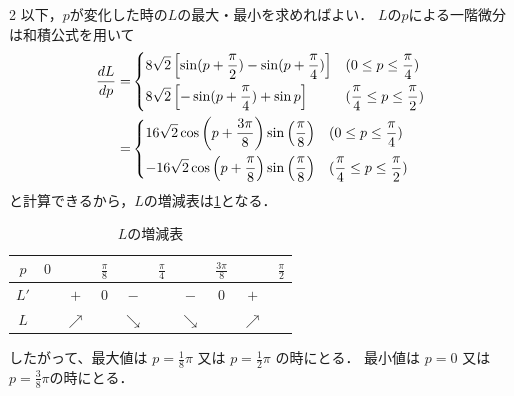 \documentclass[../../../../main.tex]{subfiles}
\begin{document}
\begin{multicols}{2}
  以下，$p$が変化した時の$L$の最大・最小を求めればよい．
  $L$の$p$による一階微分は和積公式を用いて
  \begin{align*}
    \frac{dL}{dp}=
      & \begin{dcases}
          8\sqrt{2}\left[\sin(p+\frac{\pi}{2}) -\sin(p+\frac{\pi}{4})\right] & (0 \le p \le \frac{\pi}{4})             \\
          8\sqrt{2}\left[-\sin(p+\frac{\pi}{4}) + \sin p\right]              & (\frac{\pi}{4} \le p \le \frac{\pi}{2})
        \end{dcases}      \\
    = & \begin{dcases}
          16\sqrt{2}\cos\left(p + \frac{3\pi}{8}\right)\sin\left(\frac{\pi}{8}\right) & (0 \le p \le \frac{\pi}{4})             \\
          -16\sqrt{2}\cos\left(p + \frac{\pi}{8}\right)\sin\left(\frac{\pi}{8}\right) & (\frac{\pi}{4} \le p \le \frac{\pi}{2})
        \end{dcases} \\
  \end{align*}
  と計算できるから，$L$の増減表は\cref{1994-2:table:1}となる．
  \begin{table}[H]
    \centering
    \caption{$L$の増減表}
    \label{1994-2:table:1}
    \begin{tabular}{c||c|c|c|c|c|c|c|c|c|}
      $p$  & $0$ &            & $\frac{\pi}{8}$ &            & $\frac{\pi}{4}$ &            & $\frac{3\pi}{8}$ &            & $\frac{\pi}{2}$ \\
      \hline
      $L'$ &     & $+$        & $0$             & $-$        &                 & $-$        & $0$              & $+$        &                 \\
      \hline
      $L$  &     & $\nearrow$ &                 & $\searrow$ &                 & $\searrow$ &                  & $\nearrow$ &
    \end{tabular}
  \end{table}

  したがって、最大値は $p=\frac{1}{8}\pi$ 又は $p=\frac{1}{2}\pi$ の時にとる．
  最小値は $p=0$ 又は $p=\frac{3}{8}\pi$の時にとる．


\end{multicols}
\end{document}
